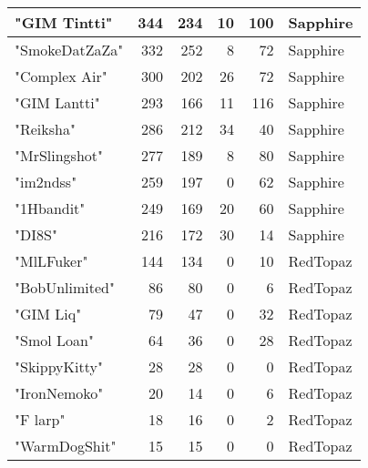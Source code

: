 \documentclass{article}
\begin{document}
\begin{table}[htbp]
\begin{tabular}{|l|r|r|r|r|l|}
"GIM Tintti" & 344 & 234 & 10 & 100 & Sapphire \\ \hline
"SmokeDatZaZa" & 332 & 252 & 8 & 72 & Sapphire \\ \hline
"Complex Air" & 300 & 202 & 26 & 72 & Sapphire \\ \hline
"GIM Lantti" & 293 & 166 & 11 & 116 & Sapphire \\ \hline
"Reiksha" & 286 & 212 & 34 & 40 & Sapphire \\ \hline
"MrSlingshot" & 277 & 189 & 8 & 80 & Sapphire \\ \hline
"im2ndss" & 259 & 197 & 0 & 62 & Sapphire \\ \hline
"1Hbandit" & 249 & 169 & 20 & 60 & Sapphire \\ \hline
"DI8S" & 216 & 172 & 30 & 14 & Sapphire \\ \hline
"MlLFuker" & 144 & 134 & 0 & 10 & RedTopaz \\ \hline
"BobUnlimited" & 86 & 80 & 0 & 6 & RedTopaz \\ \hline
"GIM Liq" & 79 & 47 & 0 & 32 & RedTopaz \\ \hline
"Smol Loan" & 64 & 36 & 0 & 28 & RedTopaz \\ \hline
"SkippyKitty" & 28 & 28 & 0 & 0 & RedTopaz \\ \hline
"IronNemoko" & 20 & 14 & 0 & 6 & RedTopaz \\ \hline
"F larp" & 18 & 16 & 0 & 2 & RedTopaz \\ \hline
"WarmDogShit" & 15 & 15 & 0 & 0 & RedTopaz \\ \hline
\end{tabular}
\end{table}
\end{document}
